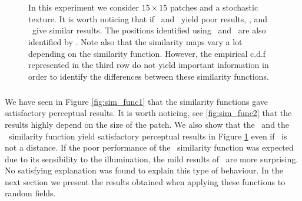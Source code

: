 \begin{figure}[H]
   \hfill
   \hfill
   \hfill
   \hfill
   \hfill \\
   \hfill
   \hfill
   \hfill
   \hfill
   \hfill \\
   \hfill
   \hfill
   \hfill
   \hfill
   \hfill
  \caption{In this experiment we consider $15 \times 15$ patches and a stochastic texture. It is worth noticing that if  \ and \sps \ yield poor results,  , \s{\infty} and \scos \ give similar results. The positions identified using \scos \ and \s{\infty} \ are also identified by  . Note also that the similarity maps vary a lot depending on the similarity function. However, the empirical c.d.f represented in the third row do not yield important information in order to identify the differences between these similarity functions.}
    \label{fig:sim_func3}
  \end{figure}
  \subparagraph{} We have seen in Figure \ref{fig:sim_func1} that the similarity functions gave satisfactory perceptual results. It is worth noticing, see \ref{fig:sim_func2} that the results highly depend on the size of the patch. We also show that the \s{\infty} \ and the \scos \ similarity function yield satisfactory perceptual results in Figure \ref{fig:sim_func3} even if \scos \ is not a distance. If the poor performance of the \sps \ similarity function was expected due to its sensibility to the illumination, the mild results of  \ are more surprising. No satisfying explanation was found to explain this type of behaviour. In the next section we present the results obtained when applying these functions to random fields.
